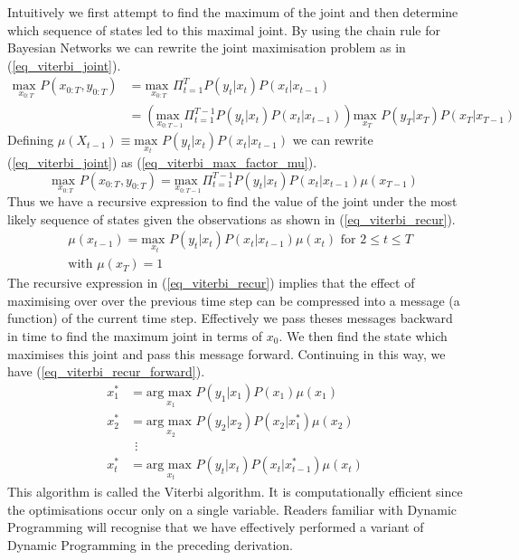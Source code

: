 Intuitively we first attempt to find the maximum of the joint and then determine which sequence of states led to this maximal joint. By using the chain rule for Bayesian Networks we can rewrite the joint maximisation problem as in (\ref{eq_viterbi_joint}).
\begin{equation}
\begin{aligned}
\underset{x_{0:T}}{\text{max }} P(x_{0:T}, y_{0:T}) &= \underset{x_{0:T}}{\text{max }} \Pi_{t=1}^T P(y_t|x_t) P(x_t|x_{t-1})\\
&= \left(\underset{x_{0:T-1}}{\text{max }} \Pi_{t=1}^{T-1} P(y_t|x_t) P(x_t|x_{t-1}) \right) \underset{x_{T}}{\text{max }} P(y_T|x_T) P(x_T|x_{T-1})
\end{aligned}
\label{eq_viterbi_joint}
\end{equation}
Defining $\mu(X_{t-1}) \equiv \underset{x_{t}}{\text{max }} P(y_t|x_t) P(x_t|x_{t-1})$ we can rewrite (\ref{eq_viterbi_joint}) as (\ref{eq_viterbi_max_factor_mu}).
\begin{equation}
\underset{x_{0:T}}{\text{max }} P(x_{0:T}, y_{0:T}) =\underset{x_{0:T-1}}{\text{max }} \Pi_{t=1}^{T-1} P(y_t|x_t) P(x_t|x_{t-1}) \mu(x_{T-1})
\label{eq_viterbi_max_factor_mu}
\end{equation}
Thus we have a recursive expression to find the value of the joint under the most likely sequence of states given the observations as shown in (\ref{eq_viterbi_recur}).
\begin{equation}
\begin{aligned}
&\mu(x_{t-1}) = \underset{x_{t}}{\text{max }} P(y_t|x_t) P(x_t|x_{t-1}) \mu(x_t) \text{ for } 2 \leq t \leq T \\
&\text{with } \mu(x_T) = 1 
\end{aligned}
\label{eq_viterbi_recur}
\end{equation}
The recursive expression in (\ref{eq_viterbi_recur}) implies that the effect of maximising over over the previous time step can be compressed into a message (a function) of the current time step. Effectively we pass theses messages backward in time to find the maximum joint in terms of $x_0$. We then find the state which maximises this joint and pass this message forward.  Continuing in this way, we have (\ref{eq_viterbi_recur_forward}).
\begin{equation}
\begin{aligned}
x_1^* &= \underset{x_{1}}{\text{arg max }}P(y_1|x_1)P(x_1)\mu(x_1) \\
x_2^* &= \underset{x_{2}}{\text{arg max }}P(y_2|x_2)P(x_2|x_1^*)\mu(x_2) \\
&~~\vdots \\
x_t^* &= \underset{x_{t}}{\text{arg max }}P(y_t|x_t)P(x_t|x_{t-1}^*)\mu(x_t)
\end{aligned}
\label{eq_viterbi_recur_forward}
\end{equation}
This algorithm is called the Viterbi algorithm. It is computationally efficient since the optimisations occur only on a single variable. Readers familiar with Dynamic Programming will recognise that we have effectively performed a variant of Dynamic Programming in the preceding derivation.

